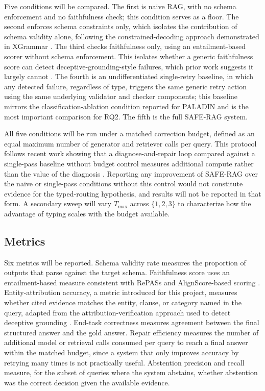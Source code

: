 \documentclass[10pt,twocolumn,letterpaper]{article}
\begin{document}
Five conditions will be compared. The first is naive RAG, with no schema enforcement and no faithfulness check; this condition serves as a floor. The second enforces schema constraints only, which isolates the contribution of schema validity alone, following the constrained-decoding approach demonstrated in XGrammar \cite{xgrammar}. The third checks faithfulness only, using an entailment-based scorer without schema enforcement. This isolates whether a generic faithfulness score can detect deceptive-grounding-style failures, which prior work suggests it largely cannot \cite{deceptive}. The fourth is an undifferentiated single-retry baseline, in which any detected failure, regardless of type, triggers the same generic retry action using the same underlying validator and checker components; this baseline mirrors the classification-ablation condition reported for PALADIN \cite{paladin} and is the most important comparison for RQ2. The fifth is the full SAFE-RAG system.

All five conditions will be run under a matched correction budget, defined as an equal maximum number of generator and retriever calls per query. This protocol follows recent work showing that a diagnose-and-repair loop compared against a single-pass baseline without budget control measures additional compute rather than the value of the diagnosis \cite{budgetrepair}. Reporting any improvement of SAFE-RAG over the naive or single-pass conditions without this control would not constitute evidence for the typed-routing hypothesis, and results will not be reported in that form. A secondary sweep will vary $T_{\max}$ across $\{1,2,3\}$ to characterize how the advantage of typing scales with the budget available.

\subsection{Metrics}

Six metrics will be reported. Schema validity rate measures the proportion of outputs that parse against the target schema. Faithfulness score uses an entailment-based measure consistent with RePASs and AlignScore-based scoring \cite{rirag,alignscore}. Entity-attribution accuracy, a metric introduced for this project, measures whether cited evidence matches the entity, clause, or category named in the query, adapted from the attribution-verification approach used to detect deceptive grounding \cite{deceptive}. End-task correctness measures agreement between the final structured answer and the gold answer. Repair efficiency measures the number of additional model or retrieval calls consumed per query to reach a final answer within the matched budget, since a system that only improves accuracy by retrying many times is not practically useful. Abstention precision and recall measure, for the subset of queries where the system abstains, whether abstention was the correct decision given the available evidence.
\end{document}
